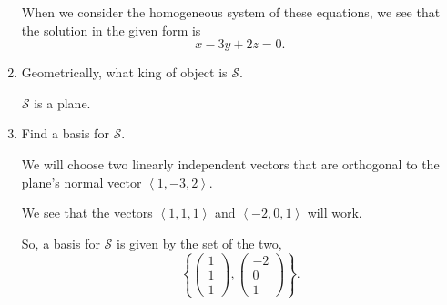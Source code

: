 \documentclass{article}
\begin{document}
\begin{enumerate}[label=(\alph*)]
  When we consider the homogeneous system of these equations, we see that the solution in the given form is
  \[
  x-3y+2z=0
  .\] 
  \item Geometrically, what king of object is $\mathcal{S}$. 

    $\mathcal{S}$ is a plane.

  \item Find a basis for $\mathcal{S}$. 

    We will choose two linearly independent vectors that are orthogonal to the plane's normal vector $\left<1,-3,2 \right>$.

    We see that the vectors $\left<1,1,1 \right>$ and $\left<-2,0,1 \right>$ will work. 

    So, a basis for $\mathcal{S}$ is given by the set of the two,
    \[
      \left\{ \begin{pmatrix} 1\\1\\1 \end{pmatrix} ,\begin{pmatrix} -2\\0\\1 \end{pmatrix} \right\} 
    .\] 
\end{enumerate}
\end{document}
